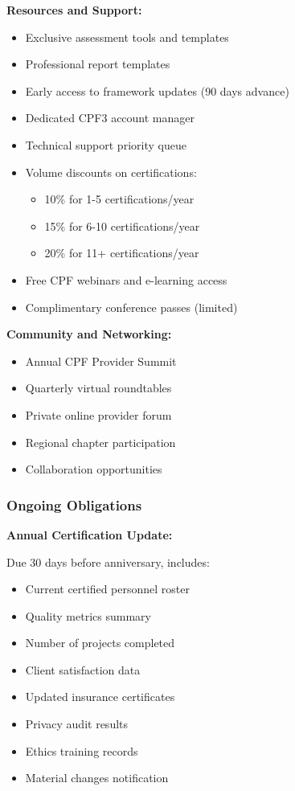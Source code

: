 \documentclass[11pt,a4paper]{article}
\begin{document}
\textbf{Resources and Support:}
\begin{itemize}
\item Exclusive assessment tools and templates
\item Professional report templates
\item Early access to framework updates (90 days advance)
\item Dedicated CPF3 account manager
\item Technical support priority queue
\item Volume discounts on certifications:
\begin{itemize}
\item 10\% for 1-5 certifications/year
\item 15\% for 6-10 certifications/year
\item 20\% for 11+ certifications/year
\end{itemize}
\item Free CPF webinars and e-learning access
\item Complimentary conference passes (limited)
\end{itemize}

\textbf{Community and Networking:}
\begin{itemize}
\item Annual CPF Provider Summit
\item Quarterly virtual roundtables
\item Private online provider forum
\item Regional chapter participation
\item Collaboration opportunities
\end{itemize}

\subsubsection{Ongoing Obligations}

\textbf{Annual Certification Update:}

Due 30 days before anniversary, includes:
\begin{itemize}
\item Current certified personnel roster
\item Quality metrics summary
\item Number of projects completed
\item Client satisfaction data
\item Updated insurance certificates
\item Privacy audit results
\item Ethics training records
\item Material changes notification
\end{itemize}
\end{document}

